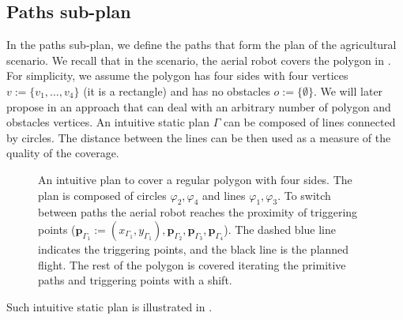 \subsection{Paths sub-plan}
\label{sec:path-wise}

In the paths sub-plan, we define the paths that form the plan of the agricultural scenario. We recall that in the scenario, the aerial robot covers the polygon in . For simplicity, we assume the polygon has four sides with four vertices $v:=\{v_1,\dots,v_4\}$ (it is a rectangle) and has no obstacles $o:=\{\emptyset\}$. We will later propose in  an approach that can deal with an arbitrary number of polygon and obstacles vertices. An intuitive static plan $\Gamma$ can be composed of lines connected by circles. The distance between the lines can be then used as a measure of the quality of the coverage.
\begin{figure}[h!]
  \centering
  
  \caption[Intuitive plan to cover a regular polygon with four sides]{An intuitive plan to cover a regular polygon with four sides. The plan is composed of circles $\varphi_2,\varphi_4$ and lines $\varphi_1,\varphi_3$. To switch between paths the aerial robot reaches the proximity of triggering points ($\mathbf{p}_{\Gamma_1}:=(x_{\Gamma_1},y_{\Gamma_1}),\mathbf{p}_{\Gamma_2},\mathbf{p}_{\Gamma_3},\mathbf{p}_{\Gamma_4}$). The dashed blue line indicates the triggering points, and the black line is the planned flight. The rest of the polygon is covered iterating the primitive paths and triggering points with a shift.}
  \label{fig:bm-like_pb}
\end{figure}
Such intuitive static plan is illustrated in .

